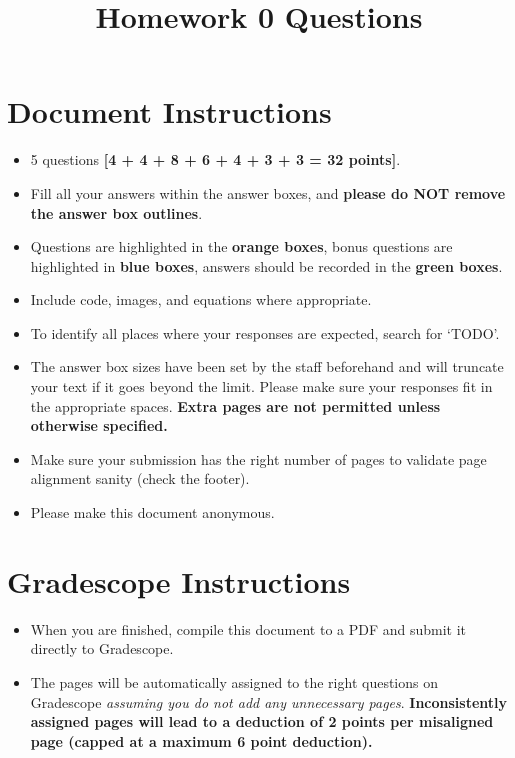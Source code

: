 \documentclass[11pt]{article}
\date{}
\title{\vspace{-1cm}Homework 0 Questions}
\begin{document}
\maketitle
\vspace{-3cm}
\thispagestyle{fancy}

\section*{ Document Instructions}
\begin{itemize}

  \item 5 questions \textbf{[4 + 4 + 8 + 6 + 4 + 3 + 3 = 32 points]}.
  \item Fill all your answers within the answer boxes, and \textbf{please do NOT remove the answer box outlines}.
  \item Questions are highlighted in the \textbf{orange boxes}, bonus questions are highlighted in \textbf{blue boxes}, answers should be recorded in the \textbf{green boxes}.
  \item Include code, images, and equations where appropriate.
  \item To identify all places where your responses are expected, search for `TODO'.
  \item The answer box sizes have been set by the staff beforehand and will truncate your text if it goes beyond the limit. Please make sure your responses fit in the appropriate spaces. \textbf{Extra pages are not permitted unless otherwise specified.}
  \item Make sure your submission has the right number of pages to validate page alignment sanity (check the footer).
  \item Please make this document anonymous.
\end{itemize}

\section*{ Gradescope Instructions}
\begin{itemize}
  \item When you are finished, compile this document to a PDF and submit it directly to Gradescope. 
  \item The pages will be automatically assigned to the right questions on Gradescope \textit{assuming you do not add any unnecessary pages}. \textbf{Inconsistently assigned pages will lead to a deduction of 2 points per misaligned page (capped at a maximum 6 point deduction).}
\end{itemize}
\end{document}
